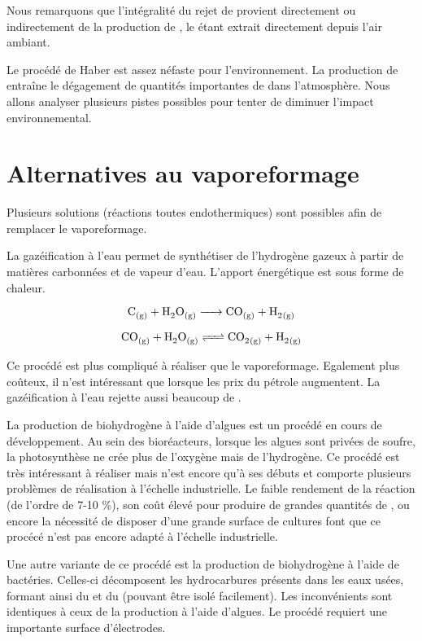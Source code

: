 \documentclass[a4paper, oneside, 12pt]{article}
\begin{document}
Nous remarquons que l'intégralité du rejet de  provient directement 
ou indirectement de la production de , le  étant extrait 
directement depuis l'air ambiant.

Le procédé de Haber est assez néfaste pour l'environnement. 
La production de  entraîne le dégagement de quantités 
importantes de  dans l'atmosphère.
Nous allons analyser plusieurs pistes possibles pour tenter 
de diminuer l'impact environnemental.

\section*{Alternatives au vaporeformage}

Plusieurs solutions (réactions toutes endothermiques) 
sont possibles afin de remplacer le vaporeformage.

La gazéification à l'eau permet de synthétiser de l'hydrogène 
gazeux à partir de matières carbonnées et de vapeur d'eau.
L'apport énergétique est sous forme de chaleur. 
\cite{hydrogene}

\[ \ce{C_{(g)} + H2O_{(g)} -> CO_{(g)} + H2_{(g)}} \]

\[ \ce{CO_{(g)} + H2O_{(g)} <=> CO2_{(g)} + H2_{(g)}} \]

Ce procédé est plus compliqué à réaliser que le vaporeformage. Egalement plus coûteux, il n'est intéressant que lorsque les prix du pétrole augmentent. La gazéification à l'eau rejette aussi beaucoup de .
\newline

La production de biohydrogène à l'aide d'algues est un procédé en cours de développement. Au sein des bioréacteurs, lorsque les algues sont privées de soufre, la photosynthèse ne crée plus de l'oxygène mais de l'hydrogène.
Ce procédé est très intéressant à réaliser mais n'est encore qu'à ses débuts et comporte plusieurs problèmes de réalisation à l'échelle industrielle. Le faible rendement de la réaction (de l'ordre de 7-10 \%), son coût élevé pour produire de grandes quantités de , ou encore la nécessité de disposer d'une grande surface de cultures font que ce procécé n'est pas encore adapté à l'échelle industrielle.
\newline

Une autre variante de ce procédé est la production de biohydrogène à l'aide de bactéries. Celles-ci décomposent les hydrocarbures présents dans les eaux usées, formant ainsi du  et du  (pouvant être isolé facilement). Les inconvénients sont identiques à ceux de la production à l'aide d'algues. Le procédé requiert une importante surface d'électrodes.
\end{document}
